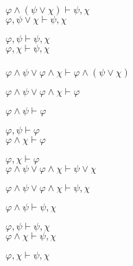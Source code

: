 \documentclass[a4paper,12pt]{article}
\begin{document}
$\varphi \land (\psi \lor \chi) \vdash \psi, \chi$ \\

$\varphi, \psi \lor \chi \vdash \psi, \chi$

$\varphi, \psi \vdash \psi, \chi$ \\


$\varphi, \chi \vdash \psi, \chi$ \\ \\



$\varphi \land \psi \lor \varphi \land \chi \vdash \varphi \land (\psi \lor \chi)$

$\varphi \land \psi \lor \varphi \land \chi \vdash \varphi$

$\varphi \land \psi \vdash \varphi$

$\varphi, \psi \vdash \varphi$ \\


$\varphi \land \chi \vdash \varphi$

$\varphi, \chi \vdash \varphi$ \\


$\varphi \land \psi \lor \varphi \land \chi \vdash \psi \lor \chi$

$\varphi \land \psi \lor \varphi \land \chi \vdash \psi, \chi$

$\varphi \land \psi \vdash \psi, \chi$

$\varphi, \psi \vdash \psi, \chi$ \\


$\varphi \land \chi \vdash \psi, \chi$

$\varphi, \chi \vdash \psi, \chi$
\end{document}
